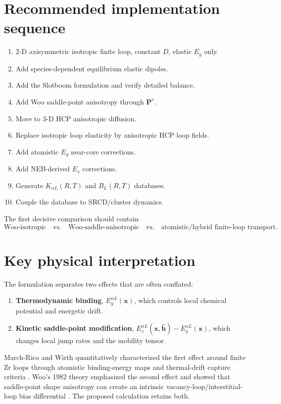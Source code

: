 \documentclass[11pt]{article}
\newcommand{\bP}{\bm{P}}
\newcommand{\bx}{\bm{x}}
\newcommand{\bh}{\bm{h}}
\begin{document}
\section{Recommended implementation sequence}
\begin{enumerate}
\item 2-D axisymmetric isotropic finite loop, constant $D$, elastic $E_g$ only.
\item Add species-dependent equilibrium elastic dipoles.
\item Add the Slotboom formulation and verify detailed balance.
\item Add Woo saddle-point anisotropy through $\bP^s$.
\item Move to 3-D HCP anisotropic diffusion.
\item Replace isotropic loop elasticity by anisotropic HCP loop fields.
\item Add atomistic $E_g$ near-core corrections.
\item Add NEB-derived $E_s$ corrections.
\item Generate $K_{\alpha L}(R,T)$ and $B_L(R,T)$ databases.
\item Couple the database to SRCD/cluster dynamics.
\end{enumerate}
The first decisive comparison should contain
\begin{equation}
\boxed{\text{Woo-isotropic}\quad\text{vs.}\quad\text{Woo-saddle-anisotropic}\quad\text{vs.}\quad\text{atomistic/hybrid finite-loop transport}.}
\end{equation}

\section{Key physical interpretation}
The formulation separates two effects that are often conflated:
\begin{enumerate}
\item \textbf{Thermodynamic binding}, $E_g^{\alpha L}(\bx)$, which controls local chemical potential and energetic drift.
\item \textbf{Kinetic saddle-point modification}, $E_s^{\alpha L}(\bx,\hat{\bh})-E_g^{\alpha L}(\bx)$, which changes local jump rates and the mobility tensor.
\end{enumerate}
March-Rico and Wirth quantitatively characterized the first effect around finite Zr loops through atomistic binding-energy maps and thermal-drift capture criteria \cite{MarchRicoWirth2023}. Woo's 1982 theory emphasized the second effect and showed that saddle-point shape anisotropy can create an intrinsic vacancy-loop/interstitial-loop bias differential \cite{Woo1982}. The proposed calculation retains both.
\end{document}

